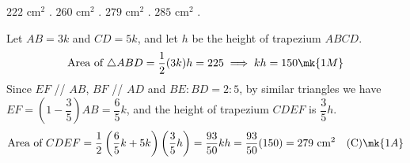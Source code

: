 \begin{minipage}{0.45\textwidth}
\begin{choices}
    \choice $222\text{ cm}^2$ .
    \choice $260\text{ cm}^2$ .
    \correctchoice $279\text{ cm}^2$ .
    \choice $285\text{ cm}^2$ .
\end{choices}
\end{minipage}
\begin{minipage}{0.52\textwidth}
\centering
{}
\end{minipage}
\begin{solution}
Let $AB = 3k$ and $CD = 5k$, and let $h$ be the height of trapezium $ABCD$.
\[ \text{Area of } \triangle ABD = \frac{1}{2}(3k)h = 225 \implies kh = 150 \mk{1M} \]
Since $EF$ // $AB$, $BF$ // $AD$ and $BE : BD = 2 : 5$, by similar triangles we have $EF = \left(1 - \dfrac{3}{5}\right)AB = \dfrac{6}{5}k$, and the height of trapezium $CDEF$ is $\dfrac{3}{5}h$.
\[ \text{Area of } CDEF = \frac{1}{2}\left(\frac{6}{5}k + 5k\right)\left(\frac{3}{5}h\right) = \frac{93}{50}kh = \frac{93}{50}(150) = 279\text{ cm}^2 \quad \text{(C)} \mk{1A} \]
\end{solution}